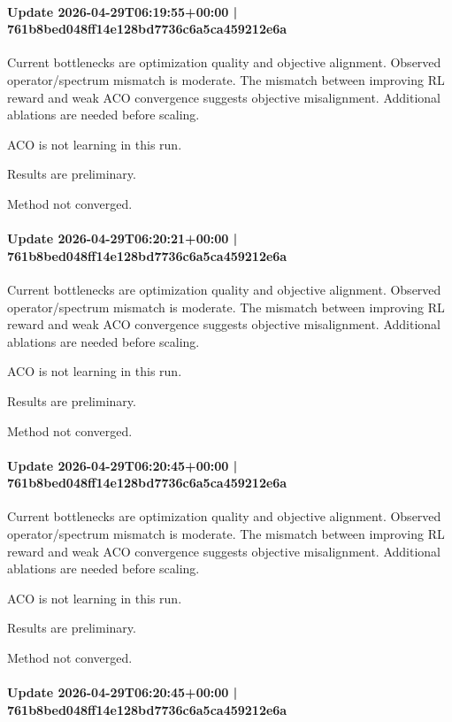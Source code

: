 \documentclass{article}
\begin{document}
\paragraph{Update 2026-04-29T06:19:55+00:00 | 761b8bed048ff14e128bd7736c6a5ca459212e6a}

Current bottlenecks are optimization quality and objective alignment. Observed operator/spectrum mismatch is moderate. The mismatch between improving RL reward and weak ACO convergence suggests objective misalignment. Additional ablations are needed before scaling.

ACO is not learning in this run.

Results are preliminary.

Method not converged.

\paragraph{Update 2026-04-29T06:20:21+00:00 | 761b8bed048ff14e128bd7736c6a5ca459212e6a}

Current bottlenecks are optimization quality and objective alignment. Observed operator/spectrum mismatch is moderate. The mismatch between improving RL reward and weak ACO convergence suggests objective misalignment. Additional ablations are needed before scaling.

ACO is not learning in this run.

Results are preliminary.

Method not converged.

\paragraph{Update 2026-04-29T06:20:45+00:00 | 761b8bed048ff14e128bd7736c6a5ca459212e6a}

Current bottlenecks are optimization quality and objective alignment. Observed operator/spectrum mismatch is moderate. The mismatch between improving RL reward and weak ACO convergence suggests objective misalignment. Additional ablations are needed before scaling.

ACO is not learning in this run.

Results are preliminary.

Method not converged.

\paragraph{Update 2026-04-29T06:20:45+00:00 | 761b8bed048ff14e128bd7736c6a5ca459212e6a}
\end{document}
